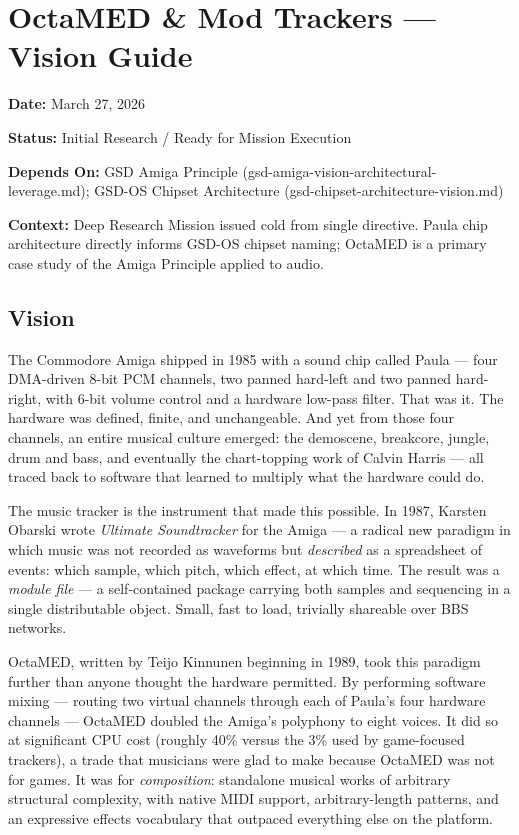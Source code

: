\documentclass[11pt,letterpaper]{article}
\newcommand{\metafield}[2]{\textbf{\sffamily #1} #2\par}
\begin{document}
\section{OctaMED \& Mod Trackers --- Vision Guide}

\metafield{Date:}{March 27, 2026}
\metafield{Status:}{Initial Research / Ready for Mission Execution}
\metafield{Depends On:}{GSD Amiga Principle (gsd-amiga-vision-architectural-leverage.md); GSD-OS Chipset Architecture (gsd-chipset-architecture-vision.md)}
\metafield{Context:}{Deep Research Mission issued cold from single directive. Paula chip architecture directly informs GSD-OS chipset naming; OctaMED is a primary case study of the Amiga Principle applied to audio.}

\subsection{Vision}

The Commodore Amiga shipped in 1985 with a sound chip called Paula --- four DMA-driven 8-bit PCM channels, two panned hard-left and two panned hard-right, with 6-bit volume control and a hardware low-pass filter. That was it. The hardware was defined, finite, and unchangeable. And yet from those four channels, an entire musical culture emerged: the demoscene, breakcore, jungle, drum and bass, and eventually the chart-topping work of Calvin Harris --- all traced back to software that learned to multiply what the hardware could do.

The music tracker is the instrument that made this possible. In 1987, Karsten Obarski wrote \textit{Ultimate Soundtracker} for the Amiga --- a radical new paradigm in which music was not recorded as waveforms but \textit{described} as a spreadsheet of events: which sample, which pitch, which effect, at which time. The result was a \textit{module file} --- a self-contained package carrying both samples and sequencing in a single distributable object. Small, fast to load, trivially shareable over BBS networks.

OctaMED, written by Teijo Kinnunen beginning in 1989, took this paradigm further than anyone thought the hardware permitted. By performing software mixing --- routing two virtual channels through each of Paula's four hardware channels --- OctaMED doubled the Amiga's polyphony to eight voices. It did so at significant CPU cost (roughly 40\% versus the 3\% used by game-focused trackers), a trade that musicians were glad to make because OctaMED was not for games. It was for \textit{composition}: standalone musical works of arbitrary structural complexity, with native MIDI support, arbitrary-length patterns, and an expressive effects vocabulary that outpaced everything else on the platform.
\end{document}

